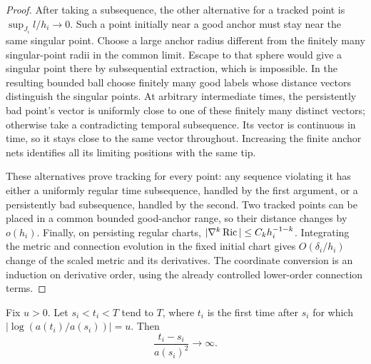 \begin{proof}
After taking a subsequence, the other alternative for a tracked point
is $\sup_{J_i}l/h_i\to0$. Such a point initially near a good anchor
must stay near the same singular point. Choose a large anchor radius
different from the finitely many singular-point radii in the common
limit. Escape to that sphere would give a singular point there by
subsequential extraction, which is impossible. In the resulting
bounded ball choose finitely many good labels whose distance vectors
distinguish the singular points. At arbitrary intermediate times,
the persistently bad point's vector is uniformly close to one of
these finitely many distinct vectors; otherwise take a contradicting
temporal subsequence. Its vector is continuous in time, so it stays
close to the same vector throughout. Increasing the finite anchor
nets identifies all its limiting positions with the same tip.

These alternatives prove tracking for every point: any sequence
violating it has either a uniformly regular time subsequence, handled
by the first argument, or a persistently bad subsequence, handled by
the second. Two tracked points can be placed in a common bounded
good-anchor range, so their distance changes by $o(h_i)$.
Finally, on persisting regular charts,
$|\nabla^k\operatorname{Ric}|\leq C_k h_i^{-1-k}$. Integrating the metric and
connection evolution in the fixed initial chart gives
$O(\delta_i/h_i)$ change of the scaled metric and its derivatives.
The coordinate conversion is an induction on derivative order,
using the already controlled lower-order connection terms.
\end{proof}

\begin{lemma}
\label{geom:scale-change-time}
Fix $u>0$. Let $s_i<t_i<T$ tend to $T$, where $t_i$ is the first time
after $s_i$ for which $|\log(a(t_i)/a(s_i))|=u$. Then
\[
 \frac{t_i-s_i}{a(s_i)^2}\longrightarrow\infty.
\]
\end{lemma}

